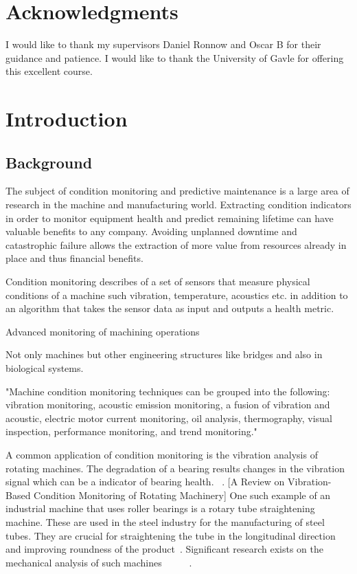 \documentclass{article}
\begin{document}
\section{Acknowledgments}
I would like to thank my supervisors Daniel Ronnow and Oscar B for their guidance and patience.
I would like to thank the University of Gavle for offering this excellent course.
\clearpage
\section{Introduction}
\subsection{Background}
The subject of condition monitoring and predictive maintenance is a large area of research in the machine and manufacturing world. Extracting condition indicators in order to monitor equipment health and predict remaining lifetime can have valuable benefits to any company. Avoiding unplanned downtime and catastrophic failure allows the extraction of more value from resources already in place and thus financial benefits.

Condition monitoring describes of a set of sensors that measure physical conditions of a machine such vibration, temperature, acoustics etc. in addition to an algorithm that takes the sensor data as input and outputs a health metric.

Advanced monitoring of machining operations~\cite{teti2010advanced}

Not only machines but other engineering structures like bridges and also in biological systems.

"Machine condition monitoring techniques can be grouped into the following: vibration monitoring, acoustic emission monitoring, a fusion of vibration and acoustic, electric motor current monitoring, oil analysis, thermography, visual inspection, performance monitoring, and trend monitoring."

A common application of condition monitoring is the vibration analysis of rotating machines. The degradation of a bearing results changes in the vibration signal which can be a indicator of bearing health. ~\cite{soualhi2021novel}.
[A Review on Vibration-Based Condition Monitoring of Rotating Machinery]
One such example of an industrial machine that uses roller bearings is a rotary tube straightening machine. These are used in the steel industry for the manufacturing of steel tubes. They are crucial for straightening the tube in the longitudinal direction and improving roundness of the product~\cite{yoshimura2009effect}. Significant research exists on the mechanical analysis of such machines ~\cite{kato2014straightening}~\cite{ma2020effect}~\cite{ma2021analysis}~\cite{yu2018theoretical}~\cite{das1991mechanics}. 
\end{document}
